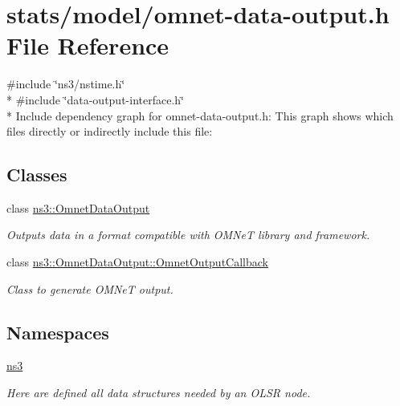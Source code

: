\hypertarget{omnet-data-output_8h}{}\section{stats/model/omnet-\/data-\/output.h File Reference}
\label{omnet-data-output_8h}
{\ttfamily \#include \char`\"{}ns3/nstime.\+h\char`\"{}}\\*
{\ttfamily \#include \char`\"{}data-\/output-\/interface.\+h\char`\"{}}\\*
Include dependency graph for omnet-\/data-\/output.h\+:
This graph shows which files directly or indirectly include this file\+:
\subsection*{Classes}
\begin{DoxyCompactItemize}
\item 
class \hyperlink{classns3_1_1OmnetDataOutput}{ns3\+::\+Omnet\+Data\+Output}
\begin{DoxyCompactList}\small\item\em Outputs data in a format compatible with O\+M\+NeT library and framework. \end{DoxyCompactList}\item 
class \hyperlink{classns3_1_1OmnetDataOutput_1_1OmnetOutputCallback}{ns3\+::\+Omnet\+Data\+Output\+::\+Omnet\+Output\+Callback}
\begin{DoxyCompactList}\small\item\em Class to generate O\+M\+NeT output. \end{DoxyCompactList}\end{DoxyCompactItemize}
\subsection*{Namespaces}
\begin{DoxyCompactItemize}
\item 
 \hyperlink{namespacens3}{ns3}
\begin{DoxyCompactList}\small\item\em Here are defined all data structures needed by an O\+L\+SR node. \end{DoxyCompactList}\end{DoxyCompactItemize}
